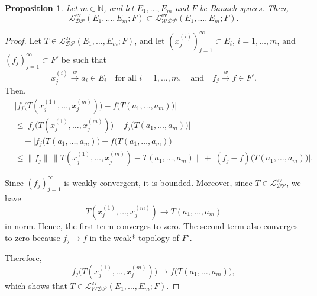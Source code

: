 \documentclass[12 pt]{article}%
\newtheorem{proposition}[theorem]{Proposition}
\newtheorem{remark}[theorem]{Remark}
\newtheorem{final remark}[theorem]{Final Remark}
\begin{document}


\begin{proposition}\label{DPEvsubWDPEv}
	Let $m \in \mathbb{N}$, and let $E_1,\dots,E_m$ and $F$ be Banach spaces. Then,
	\[
	\mathcal{L_{DP}^{\mathrm{ev}}}(E_1,\dots,E_m;F)
	\subset
	\mathcal{L_{WDP}^{\mathrm{ev}}}(E_1,\dots,E_m;F).
	\]
\end{proposition}

\begin{proof}
	Let $T \in \mathcal{L_{DP}^{\mathrm{ev}}}(E_1,\dots,E_m;F)$, and let $(x_j^{(i)})_{j=1}^{\infty} \subset E_i$, $i=1,\dots,m$, and $(f_j)_{j=1}^{\infty} \subset F'$ be such that
	\[
	x_j^{(i)} \overset{w}{\longrightarrow} a_i \in E_i
	\quad \text{for all } i=1,\dots,m,
	\quad \text{and} \quad
	f_j \overset{w}{\longrightarrow} f \in F'.
	\]
	Then,
	\begin{align*}
		&\big|f_j\big(T(x_j^{(1)},\dots,x_j^{(m)})\big) - f\big(T(a_1,\dots,a_m)\big)\big| \\
		&\le \big|f_j\big(T(x_j^{(1)},\dots,x_j^{(m)})\big) - f_j\big(T(a_1,\dots,a_m)\big)\big| \\
		&\quad + \big|f_j\big(T(a_1,\dots,a_m)\big) - f\big(T(a_1,\dots,a_m)\big)\big| \\
		&\le \|f_j\| \, \big\|T(x_j^{(1)},\dots,x_j^{(m)}) - T(a_1,\dots,a_m)\big\|
		+ \big|(f_j - f)\big(T(a_1,\dots,a_m)\big)\big|.
	\end{align*}
	
	Since $(f_j)_{j=1}^{\infty}$ is weakly convergent, it is bounded. Moreover, since $T \in \mathcal{L_{DP}^{\mathrm{ev}}}$, we have
	\[
	T(x_j^{(1)},\dots,x_j^{(m)}) \longrightarrow T(a_1,\dots,a_m)
	\]
	in norm. Hence, the first term converges to zero. The second term also converges to zero because $f_j \to f$ in the weak* topology of $F'$.
	
	Therefore,
	\[
	f_j\big(T(x_j^{(1)},\dots,x_j^{(m)})\big)
	\longrightarrow
	f\big(T(a_1,\dots,a_m)\big),
	\]
	which shows that $T \in \mathcal{L_{WDP}^{\mathrm{ev}}}(E_1,\dots,E_m;F)$.
\end{proof}
\end{document}
